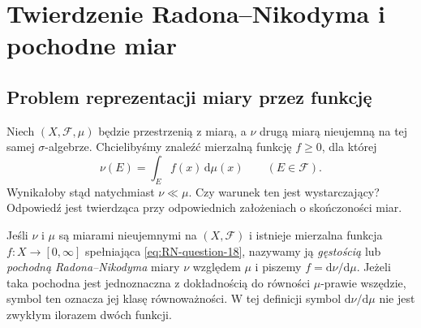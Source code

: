 \chapter[Twierdzenie Radona--Nikodyma]{Twierdzenie Radona--Nikodyma i pochodne miar}
\label{ch:radon-nikodym-18}

\providecommand{\atlasref}[2]{#2}


\section{Problem reprezentacji miary przez funkcję}
Niech $(X,\mathcal F,\mu)$ będzie przestrzenią z miarą,
a $\nu$ drugą miarą nieujemną na tej samej $\sigma$-algebrze.
Chcielibyśmy znaleźć mierzalną funkcję $f\ge0$, dla której
\begin{equation}\label{eq:RN-question-18}
\nu(E)=\int_E f(x)\,\mathrm d\mu(x)
\qquad(E\in\mathcal F).
\end{equation}
Wynikałoby stąd natychmiast $\nu\ll\mu$.
Czy warunek ten jest wystarczający? Odpowiedź jest twierdząca
przy odpowiednich założeniach o skończoności miar.

\begin{definicja}
\label{def:RN-derivative-18}
Jeśli $\nu$ i $\mu$ są miarami nieujemnymi na $(X,\mathcal F)$
i istnieje mierzalna funkcja $f:X\to[0,\infty]$
spełniająca \eqref{eq:RN-question-18}, nazywamy ją
\emph{gęstością} lub \emph{pochodną Radona--Nikodyma}
miary $\nu$ względem $\mu$ i piszemy
$f=\mathrm d\nu/\mathrm d\mu$. Jeżeli taka pochodna
jest jednoznaczna z dokładnością do równości $\mu$-prawie
wszędzie, symbol ten oznacza jej klasę równoważności.
W tej definicji symbol $\mathrm d\nu/\mathrm d\mu$
nie jest zwykłym ilorazem dwóch funkcji.
\end{definicja}

